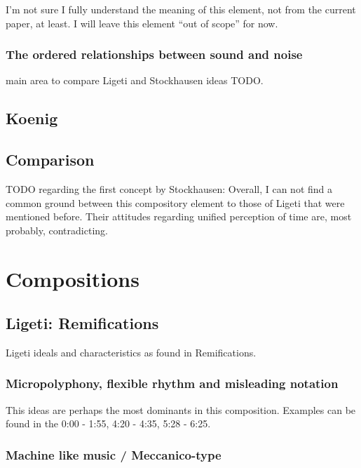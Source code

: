 \documentclass[a4paper,11pt]{article}
\begin{document}
I'm not sure I fully understand the meaning of this element, not from the current paper, at least.
I will leave this element ``out of scope'' for now.

\subsubsection{The ordered relationships between sound and noise}
\label{subs:stockhausen:noise}

main area to compare Ligeti and Stockhausen ideas TODO.

\subsection{Koenig}
\label{sub:eshtetic_koenig}

\subsection{Comparison}

TODO regarding the first concept by Stockhausen:
Overall, I can not find a common ground between this compository element to those of Ligeti that were mentioned before.
Their attitudes regarding unified perception of time are, most probably, contradicting.

\section{Compositions}
\label{sec:compositions}

\subsection{Ligeti: Remifications}
\label{sub:composition_ligeti}

Ligeti ideals and characteristics as found in Remifications.

\subsubsection{Micropolyphony, flexible rhythm and misleading notation}

This ideas are perhaps the most dominants in this composition.
Examples can be found in the 0:00 - 1:55, 4:20 - 4:35, 5:28 - 6:25.

\subsubsection{Machine like music / Meccanico-type}
\end{document}
